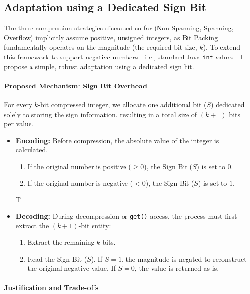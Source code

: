 \documentclass[11pt, a4paper]{article}
\begin{document}
	\subsection{Adaptation using a Dedicated Sign Bit}
	
	The three compression strategies discussed so far (Non-Spanning, Spanning, Overflow) implicitly assume positive, unsigned integers, as Bit Packing fundamentally operates on the magnitude (the required bit size, $k$). To extend this framework to support negative numbers—i.e., standard Java \texttt{int} values—I propose a simple, robust adaptation using a dedicated sign bit.
	
	\paragraph{Proposed Mechanism: Sign Bit Overhead}
	For every $k$-bit compressed integer, we allocate one additional bit ($S$) dedicated solely to storing the sign information, resulting in a total size of $(k+1)$ bits per value.
	
	\begin{itemize}
		\item \textbf{Encoding:} Before compression, the absolute value of the integer is calculated.
		\begin{enumerate}
			\item If the original number is positive ($\ge 0$), the Sign Bit ($S$) is set to $0$.
			\item If the original number is negative ($< 0$), the Sign Bit ($S$) is set to $1$.
		\end{enumerate}
		T
		
		\item \textbf{Decoding:} During decompression or \texttt{get()} access, the process must first extract the $(k+1)$-bit entity:
		\begin{enumerate}
			\item Extract the remaining $k$ bits.
			\item Read the Sign Bit ($S$). If $S=1$, the magnitude is negated to reconstruct the original negative value. If $S=0$, the value is returned as is.
		\end{enumerate}
	\end{itemize}
	
	\paragraph{Justification and Trade-offs}
	
\end{document}
